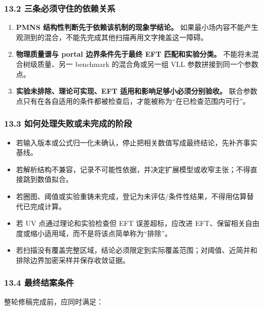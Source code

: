 \documentclass[
  chinese,
  UTF8]{ctexart}
\providecommand{\tightlist}{%
  \setlength{\itemsep}{0pt}\setlength{\parskip}{0pt}}
\begin{document}
\subsubsection{13.2
三条必须守住的依赖关系}\label{ux4e09ux6761ux5fc5ux987bux5b88ux4f4fux7684ux4f9dux8d56ux5173ux7cfb}

\begin{enumerate}
\def\labelenumi{\arabic{enumi}.}
\tightlist
\item
  \textbf{PMNS 结构性判断先于依赖该机制的现象学结论。}
  如果最小场内容不能产生观测到的混合，不能先完成其他扫描再用文字掩盖这一障碍。
\item
  \textbf{物理质量谱与 portal 边界条件先于最终 EFT 匹配和实验分类。}
  不能将未混合树级质量、另一 benchmark 的混合角或另一组 VLL
  参数拼接到同一个参数点。
\item
  \textbf{实验未排除、理论可实现、EFT 适用和影响足够小必须分别验收。}
  联合参数点只有在各自适用的条件都被检查后，才能被称为``在已检查范围内可行''。
\end{enumerate}

\subsubsection{13.3
如何处理失败或未完成的阶段}\label{ux5982ux4f55ux5904ux7406ux5931ux8d25ux6216ux672aux5b8cux6210ux7684ux9636ux6bb5}

\begin{itemize}
\tightlist
\item
  若输入版本或公式归一化未确认，停止把相关数值写成最终结论，先补齐事实基线。
\item
  若解析结构不兼容，记录不可能性依据，并决定扩展模型或收窄主张；不得直接跳到数值拟合。
\item
  若圈图、阈值或实验重铸未完成，登记为未评估/条件性结果，不得用估算替代已完成计算。
\item
  若 UV 点通过理论和实验检查但 EFT 误差超标，应改进
  EFT、保留相关自由度或缩小适用域，而不是将该点简单称为``排除''。
\item
  若扫描没有覆盖完整区域，结论必须限定到实际覆盖范围；对阈值、近简并和排除边界加密采样并保存收敛证据。
\end{itemize}

\subsubsection{13.4
最终结案条件}\label{ux6700ux7ec8ux7ed3ux6848ux6761ux4ef6}

整轮修稿完成前，应同时满足：
\end{document}
